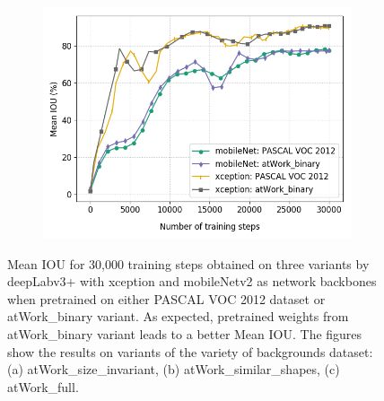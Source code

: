 \begin{figure}
\begin{subfigure}{.3\textwidth}
			\includegraphics[width=1\linewidth]{images/transfer_full}
			\caption{}
		\end{subfigure}
		\caption{Mean IOU for 30,000 training steps obtained on three variants by deepLabv3+ with xception and mobileNetv2 as network backbones when pretrained on either PASCAL VOC 2012 dataset or atWork\_binary variant. As expected, pretrained weights from atWork\_binary variant leads to a better Mean IOU. The figures show the results on variants of the variety of backgrounds dataset: (a) atWork\_size\_invariant, (b) atWork\_similar\_shapes, (c) atWork\_full.}
		\label{Fig:transfer}
	\end{figure}

